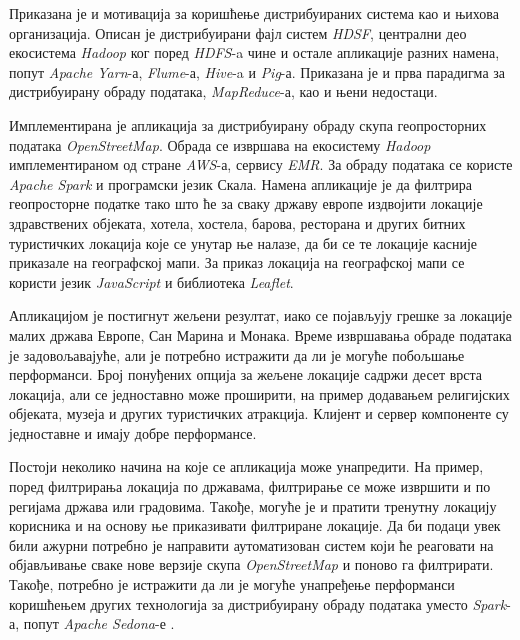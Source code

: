 \documentclass[12pt,oneside]{memoir}
\begin{document}
Приказана је и мотивација за коришћење дистрибуираних система као и њихова организација. Описан је дистрибуирани фајл систем \textit{HDSF}, централни део екосистема \textit{Hadoop} ког поред \textit{HDFS}-a чине и остале апликације разних намена, попут \textit{Apache Yarn}-а, \textit{Flume}-а, \textit{Hive}-a и \textit{Pig}-а. Приказана је и прва парадигма за дистрибуирану обраду података, \textit{MapReduce}-а, као и њени недостаци.

Имплементирана је апликација за дистрибуирану обраду скупа геопросторних података \textit{OpenStreetMap}. Обрада се извршава на екосистему \textit{Hadoop} имплементираном од стране \textit{AWS}-а, сервису \textit{EMR}. За обраду података се користе \textit{Apache Spark} и програмски језик Скала. Намена апликације је да филтрира геопросторне податке тако што ће за сваку државу европе издвојити локације здравствених објеката, хотела, хостела, барова, ресторана и других битних туристичких локација које се унутар ње налазе, да би се те локације касније приказале на географској мапи. За приказ локација на географској мапи се користи језик \textit{JavaScript} и библиотека \textit{Leaflet}.

Апликацијом је постигнут жељени резултат, иако се појављују грешке за локације малих држава Европе, Сан Марина и Монака. Време извршавања обраде података је задовољавајуће, али је потребно истражити да ли је могуће побољшање перформанси. Број понуђених опција за жељене локације садржи десет врста локација, али се једноставно може проширити, на пример додавањем религијских објеката, музеја и других туристичких атракција. Клијент и сервер компоненте су једноставне и имају добре перформансе.

Постоји неколико начина на које се апликација може унапредити. На пример, поред филтрирања локација по државама, филтрирање се може извршити и по регијама држава или градовима. Такође, могуће је и пратити тренутну локацију корисника и на основу ње приказивати филтриране локације. Да би подаци увек били ажурни потребно је направити аутоматизован систем који ће реаговати на објављивање сваке нове верзије скупа \textit{OpenStreetMap} и поново га филтрирати. Такође, потребно је истражити да ли је могуће унапређење перформанси коришћењем других технологија за дистрибуирану обраду података уместо \textit{Spark}-а, попут  \textit{Apache Sedona}-е \cite{apache_sedona}.


\end{document}
